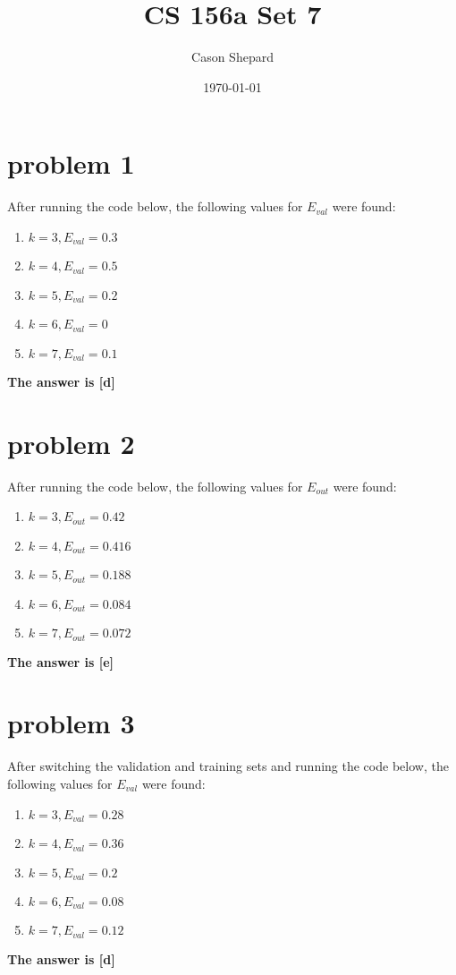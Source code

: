 \documentclass{article}
\title{CS 156a Set 7}
\author{Cason Shepard}
\date\today
\begin{document}
\maketitle

\section*{problem 1}
After running the code below, the following values for $E_{val}$ were found:
\begin{enumerate}[label=(\alph*)]
    \item $k = 3, E_{val} = 0.3$
    \item $k = 4, E_{val} = 0.5$
    \item $k = 5, E_{val} = 0.2$
    \item $k = 6, E_{val} = 0$
    \item $k = 7, E_{val} = 0.1$
\end{enumerate}
\textbf{The answer is [d]}

\section*{problem 2}
After running the code below, the following values for $E_{out}$ were found:
\begin{enumerate}[label=(\alph*)]
    \item $k = 3, E_{out} = 0.42$
    \item $k = 4, E_{out} = 0.416$
    \item $k = 5, E_{out} = 0.188$
    \item $k = 6, E_{out} = 0.084$
    \item $k = 7, E_{out} = 0.072$
\end{enumerate}
\textbf{The answer is [e]}

\section*{problem 3}
After switching the validation and training sets and running the code below, the following values for $E_{val}$ were found:
\begin{enumerate}[label=(\alph*)]
    \item $k = 3, E_{val} = 0.28$
    \item $k = 4, E_{val} = 0.36$
    \item $k = 5, E_{val} = 0.2$
    \item $k = 6, E_{val} = 0.08$
    \item $k = 7, E_{val} = 0.12$
\end{enumerate}
\textbf{The answer is [d]}
\end{document}
